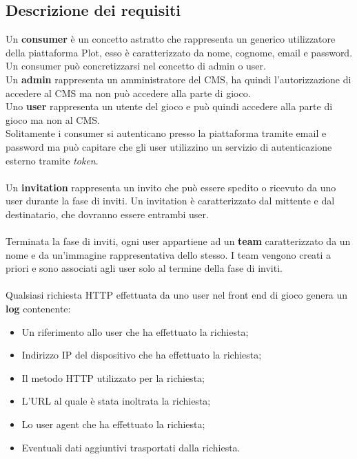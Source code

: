 \subsection{Descrizione dei requisiti}
Un \textbf{consumer} è un concetto astratto che rappresenta un generico utilizzatore della piattaforma Plot, esso è caratterizzato da nome, cognome, email e password.
Un consumer può concretizzarsi nel concetto di admin o user. \\
Un \textbf{admin} rappresenta un amministratore del CMS, ha quindi l'autorizzazione di accedere al CMS ma non può accedere alla parte di gioco. \\ 
Uno \textbf{user} rappresenta un utente del gioco e può quindi accedere alla parte di gioco ma non al CMS. \\
Solitamente i consumer si autenticano presso la piattaforma tramite email e password ma può capitare che gli user utilizzino un servizio di autenticazione esterno tramite \textit{token}.
\\ \\
Un \textbf{invitation} rappresenta un invito che può essere spedito o ricevuto da uno user durante la fase di inviti. Un invitation è caratterizzato dal mittente e dal destinatario, che dovranno essere entrambi user.
\\ \\
Terminata la fase di inviti, ogni user appartiene ad un \textbf{team} caratterizzato da un nome e da un'immagine rappresentativa dello stesso. I team vengono creati a priori e sono associati agli user solo al termine della fase di inviti. 
\\ \\
Qualsiasi richiesta HTTP effettuata da uno user nel front end di gioco genera un \textbf{log} contenente:
\begin{itemize}
	\item Un riferimento allo user che ha effettuato la richiesta;
	\item Indirizzo IP del dispositivo che ha effettuato la richiesta;
	\item Il metodo HTTP utilizzato per la richiesta;
	\item L'URL al quale è stata inoltrata la richiesta;
	\item Lo user agent che ha effettuato la richiesta;
	\item Eventuali dati aggiuntivi trasportati dalla richiesta.
\end{itemize}  

